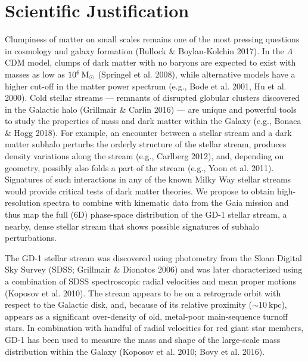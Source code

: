 \documentclass[12pt]{article}
\begin{document}
%
%
\section*{Scientific Justification}\vskip-0.2in


Clumpiness of matter on small scales remains one of the most pressing questions in cosmology and galaxy formation (Bullock \& Boylan-Kolchin 2017).
In the $\Lambda$CDM model, clumps of dark matter with no baryons are expected to exist with masses as low as $10^{6}\rm\,M_\odot$ (Springel et al. 2008), while alternative models have a higher cut-off in the matter power spectrum (e.g., Bode et al. 2001, Hu et al. 2000).
Cold stellar streams --- remnants of disrupted globular clusters discovered in the Galactic halo (Grillmair \& Carlin 2016) --- are unique and powerful tools to study the properties of mass and dark matter within the Galaxy (e.g., Bonaca \& Hogg 2018).
For example, an encounter between a stellar stream and a dark matter subhalo perturbs the orderly structure of the stellar stream, produces density variations along the stream (e.g., Carlberg 2012), and, depending on geometry, possibly also folds a part of the stream (e.g., Yoon et al. 2011).
Signatures of such interactions in any of the known Milky Way stellar streams would provide critical tests of dark matter theories.
We propose to obtain high-resolution spectra to combine with kinematic data from the Gaia mission and thus map the full (6D) phase-space distribution of the GD-1 stellar stream, a nearby, dense stellar stream that shows possible signatures of subhalo perturbations.

The GD-1 stellar stream was discovered using photometry from the Sloan Digital Sky Survey (SDSS; Grillmair \& Dionatos 2006) and was later characterized using a combination of SDSS spectroscopic radial velocities and mean proper motions (Koposov et al. 2010).
The stream appears to be on a retrograde orbit with respect to the Galactic disk, and, because of its relative proximity ($\sim 10~\textrm{kpc}$), appears as a significant over-density of old, metal-poor main-sequence turnoff stars.
In combination with handful of radial velocities for red giant star members, GD-1 has been used to measure the mass and shape of the large-scale mass distribution within the Galaxy (Koposov et al. 2010; Bovy et al. 2016).
\end{document}

